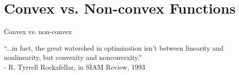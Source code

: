 













\section{Convex vs. Non-convex Functions}


\begin{vbframe}{Convex vs. non-convex}

\vspace*{2cm}

\begin{center}
\Large{\enquote{...in fact, the great watershed in optimization isn't between linearity and nonlinearity, but convexity and nonconvexity.}}\\
\normalsize - R. Tyrrell Rockafellar, in SIAM Review, 1993
\end{center}

	
\end{vbframe}

